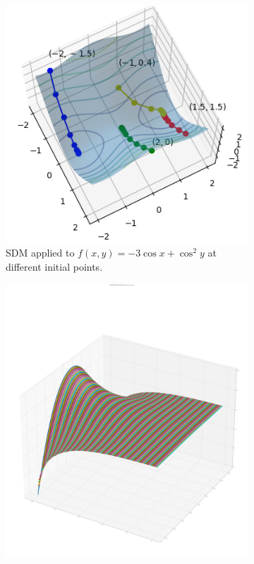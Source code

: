 \documentclass[../dissertation.tex]{subfiles}
\begin{document}
\begin{figure}[tbp]
    \centering
    \begin{subfigure}[b]{0.4\textwidth}
        \includegraphics[width=\textwidth]{sections/gradientFlowImgs/sdm}
        \caption{SDM applied to $f(x,y) = -3 \cos x + \cos^2 y$ at different initial points.}
        \label{fig: SDM}
    \end{subfigure}
    \hspace{1cm}
    \begin{subfigure}[b]{0.4\textwidth}
        \includegraphics[width=\textwidth]{sections/gradientFlowImgs/gf}

\end{subfigure}
\end{figure}
\end{document}
